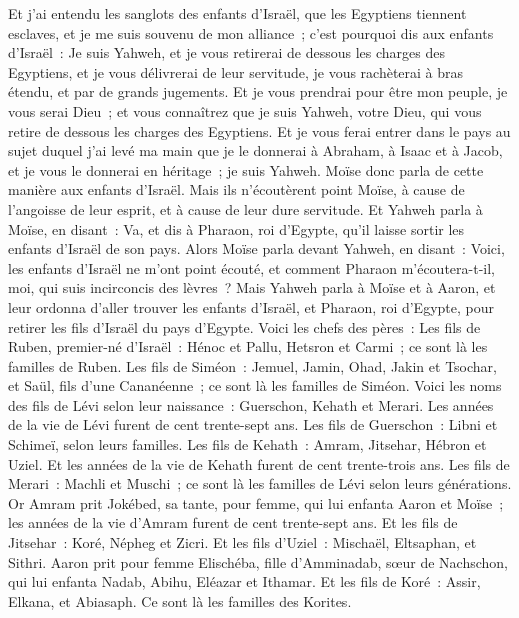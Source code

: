 \begin{multicols}{2}
Et j'ai entendu les sanglots des enfants d'Israël, que les Egyptiens tiennent esclaves, et je me suis souvenu de mon alliance~;
c'est pourquoi dis aux enfants d'Israël~: Je suis Yahweh, et je vous retirerai de dessous les charges des Egyptiens, et je vous délivrerai de leur servitude, je vous rachèterai à bras étendu, et par de grands jugements.
Et je vous prendrai pour être mon peuple, je vous serai Dieu~; et vous connaîtrez que je suis Yahweh, votre Dieu, qui vous retire de dessous les charges des Egyptiens.
Et je vous ferai entrer dans le pays au sujet duquel j'ai levé ma main que je le donnerai à Abraham, à Isaac et à Jacob, et je vous le donnerai en héritage~; je suis Yahweh.
Moïse donc parla de cette manière aux enfants d'Israël. Mais ils n'écoutèrent point Moïse, à cause de l'angoisse de leur esprit, et à cause de leur dure servitude.
Et Yahweh parla à Moïse, en disant~:
Va, et dis à Pharaon, roi d'Egypte, qu'il laisse sortir les enfants d'Israël de son pays.
Alors Moïse parla devant Yahweh, en disant~: Voici, les enfants d'Israël ne m'ont point écouté, et comment Pharaon m'écoutera-t-il, moi, qui suis incirconcis des lèvres~?
 Mais Yahweh parla à Moïse et à Aaron, et leur ordonna d'aller trouver les enfants d'Israël, et Pharaon, roi d'Egypte, pour retirer les fils d'Israël du pays d'Egypte.
Voici les chefs des pères~: Les fils de Ruben, premier-né d'Israël~: Hénoc et Pallu, Hetsron et Carmi~; ce sont là les familles de Ruben.
Les fils de Siméon~: Jemuel, Jamin, Ohad, Jakin et Tsochar, et Saül, fils d'une Cananéenne~; ce sont là les familles de Siméon.
Voici les noms des fils de Lévi selon leur naissance~: Guerschon, Kehath et Merari. Les années de la vie de Lévi furent de cent trente-sept ans.
Les fils de Guerschon~: Libni et Schimeï, selon leurs familles.
Les fils de Kehath~: Amram, Jitsehar, Hébron et Uziel. Et les années de la vie de Kehath furent de cent trente-trois ans.
Les fils de Merari~: Machli et Muschi~; ce sont là les familles de Lévi selon leurs générations.
Or Amram prit Jokébed, sa tante, pour femme, qui lui enfanta Aaron et Moïse~; les années de la vie d'Amram furent de cent trente-sept ans.
Et les fils de Jitsehar~: Koré, Népheg et Zicri.
Et les fils d'Uziel~: Mischaël, Eltsaphan, et Sithri.
Aaron prit pour femme Elischéba, fille d'Amminadab, sœur de Nachschon, qui lui enfanta Nadab, Abihu, Eléazar et Ithamar.
Et les fils de Koré~: Assir, Elkana, et Abiasaph. Ce sont là les familles des Korites.

\end{multicols}
